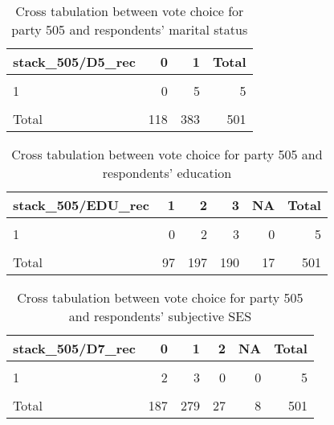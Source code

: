 \documentclass[
]{article}
\begin{document}
\begin{table}

\caption{\label{tab:unnamed-chunk-43}Cross tabulation between vote choice for party 505 and respondents' marital status
                   \label{table:crosstab_2_cy}}
\centering
\begin{tabular}[t]{l|r|r|r}
\hline
stack\_505/D5\_rec & 0 & 1 & Total\\
\hline
\cellcolor{gray!6}{0} & \cellcolor{gray!6}{104} & \cellcolor{gray!6}{334} & \cellcolor{gray!6}{438}\\
\hline
1 & 0 & 5 & 5\\
\hline
\cellcolor{gray!6}{NA} & \cellcolor{gray!6}{14} & \cellcolor{gray!6}{44} & \cellcolor{gray!6}{58}\\
\hline
Total & 118 & 383 & 501\\
\hline
\end{tabular}
\end{table}

\begin{table}

\caption{\label{tab:unnamed-chunk-43}Cross tabulation between vote choice for party 505 and respondents' education 
                   \label{table:crosstab_3_cy}}
\centering
\begin{tabular}[t]{l|r|r|r|r|r}
\hline
stack\_505/EDU\_rec & 1 & 2 & 3 & NA & Total\\
\hline
\cellcolor{gray!6}{0} & \cellcolor{gray!6}{92} & \cellcolor{gray!6}{175} & \cellcolor{gray!6}{154} & \cellcolor{gray!6}{17} & \cellcolor{gray!6}{438}\\
\hline
1 & 0 & 2 & 3 & 0 & 5\\
\hline
\cellcolor{gray!6}{NA} & \cellcolor{gray!6}{5} & \cellcolor{gray!6}{20} & \cellcolor{gray!6}{33} & \cellcolor{gray!6}{0} & \cellcolor{gray!6}{58}\\
\hline
Total & 97 & 197 & 190 & 17 & 501\\
\hline
\end{tabular}
\end{table}

\begin{table}

\caption{\label{tab:unnamed-chunk-43}Cross tabulation between vote choice for party 505 and respondents' subjective SES 
                   \label{table:crosstab_4_cy}}
\centering
\begin{tabular}[t]{l|r|r|r|r|r}
\hline
stack\_505/D7\_rec & 0 & 1 & 2 & NA & Total\\
\hline
\cellcolor{gray!6}{0} & \cellcolor{gray!6}{161} & \cellcolor{gray!6}{246} & \cellcolor{gray!6}{25} & \cellcolor{gray!6}{6} & \cellcolor{gray!6}{438}\\
\hline
1 & 2 & 3 & 0 & 0 & 5\\
\hline
\cellcolor{gray!6}{NA} & \cellcolor{gray!6}{24} & \cellcolor{gray!6}{30} & \cellcolor{gray!6}{2} & \cellcolor{gray!6}{2} & \cellcolor{gray!6}{58}\\
\hline
Total & 187 & 279 & 27 & 8 & 501\\
\hline
\end{tabular}
\end{table}
\end{document}
